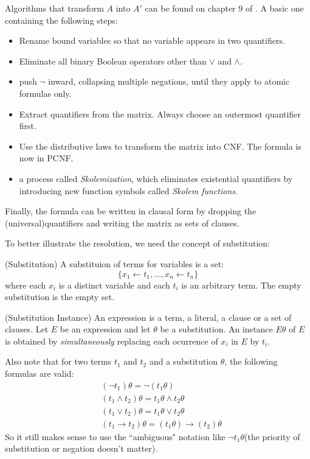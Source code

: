 \documentclass{article}
\begin{document}
Algorithms that transform $A$ into $A'$ can be found on chapter 9 of \cite{example}. A basic one containing the following steps:
\begin{itemize}
\item Rename bound variables so that no variable appears in two quantifiers.
\item Eliminate all binary Boolean operators other than $\vee$ and $\wedge$.
\item push $\neg$ inward, collapsing multiple negations, until they apply to atomic formulas only. 
\item Extract quantifiers from the matrix. Always choose an outermost quantifier first.
\item Use the distributive laws to transform the matrix into CNF. The formula is now
in PCNF.
\item a process called \textit{Skolemization}, which eliminates existential quantifiers by introducing new function symbols called \textit{Skolem functions}. 
\end{itemize}
Finally, the formula can be written in clausal form by dropping the (universal)quantifiers and writing the matrix as sets of clauses.\newline

To better illustrate the resolution, we need the concept of substitution:

\begin{defin}(Substitution)\newline
A substituion of terms for variables is a set:
\[
\{ x_1 \leftarrow t_1,\dots,x_n \leftarrow t_n\}
\]
where each $x_i$ is a distinct variable and each $t_i$ is an arbitrary term. The empty substitution is the empty set. 
\end{defin}

\begin{defin}(Substitution Instance)\newline
An expression is a term, a literal, a clause or a set of clauses. Let $E$  be an expression and let $\theta$ be a substitution. An instance $E\theta$ of $E$ is obtained by \textit{simultaneously} replacing each ocurrence of $x_i$ in $E$ by $t_i$.
\end{defin}

\noindent Also note that for two terms $t_1$ and $t_2$ and a substitution $\theta$, the following formulas are valid:
\begin{align*}
&(\neg t_1)\theta = \neg(t_1\theta)\\
&(t_1 \wedge t_2)\theta = t_1\theta \wedge t_2\theta\\
&(t_1 \vee t_2)\theta = t_1\theta \vee t_2\theta\\
&(t_1 \to t_2)\theta = (t_1\theta) \to (t_2)\theta
\end{align*}
\noindent So it still makes sense to use the ``ambiguous" notation like $\neg t_1 \theta$(the priority of substitution or negation doesn't matter).\newline
\end{document}
